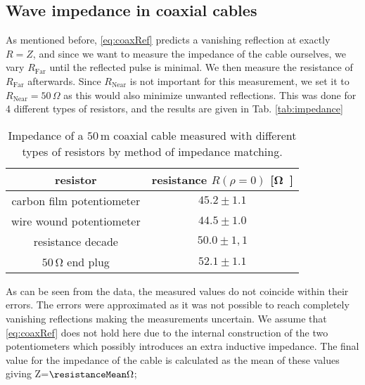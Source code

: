 \documentclass[a4paper,10pt,twocolumn]{article}
\begin{document}
    \subsection{Wave impedance in coaxial cables}
    As mentioned before, \autoref{eq:coaxRef} predicts a vanishing reflection at exactly $R=Z$, and since we want to measure the impedance of the cable ourselves, we vary $R_{\text{Far}}$ until the reflected pulse is minimal.
    We then measure the resistance of $R_{\text{Far}}$ afterwards.
    Since $R_{\text{Near}}$ is not important for this measurement, we set it to $R_{\text{Near}}=50\,\Omega$ as this would also minimize unwanted reflections.
    This was done for 4 different types of resistors, and the results are given in Tab. \autoref{tab:impedance}
    \begin{table}[htbp]          %
        \centering
        \begin{tabular*}{\linewidth}{@{\extracolsep{\fill}}cc}
            \hline
            \hline
            \rule[-7pt]{0pt}{23pt}  resistor  &  resistance $R(\rho=0)$ [\si\ohm]  	 \\
            \hline
            \rule[-5pt]{0pt}{23pt}   carbon film potentiometer   &   $45.2 \pm 1.1$  	 \\
            \rule[-5pt]{0pt}{23pt}   wire wound potentiometer   &   $44.5 \pm 1.0$  	 \\
            \rule[-5pt]{0pt}{23pt}   resistance decade   &   $50.0 \pm 1,1$  	 \\
            \rule[-5pt]{0pt}{23pt}   $50\,\si\ohm$ end plug   &   $52.1 \pm 1.1$  	 \\
            \hline
            \hline
        \end{tabular*}
        \normalsize
        \caption[]{Impedance of a $50\,$m coaxial cable measured with different types of resistors by method of impedance matching.}  %
        \label{tab:impedance}                             %
    \end{table}
    
    As can be seen from the data, the measured values do not coincide within their errors.
    The errors were approximated as it was not possible to reach completely vanishing reflections making the measurements uncertain.
    We assume that \autoref{eq:coaxRef} does not hold here due to the internal construction of the two potentiometers which possibly introduces an extra inductive impedance.
    The final value for the impedance of the cable is calculated as the mean of these values giving Z=$\resistanceMean \Omega$;
\end{document}
